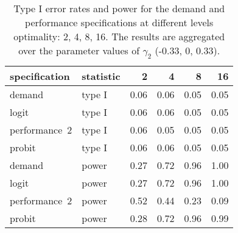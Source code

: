 \begin{table}[ht]
\centering
\begingroup\footnotesize
\begin{tabular}{llrrrr}
  \hline
specification & statistic & 2 & 4 & 8 & 16 \\ 
  \hline
demand & type I & 0.06 & 0.06 & 0.05 & 0.05 \\ 
  logit & type I & 0.06 & 0.06 & 0.05 & 0.05 \\ 
  performance~2 & type I & 0.06 & 0.05 & 0.05 & 0.05 \\ 
  probit & type I & 0.06 & 0.06 & 0.05 & 0.05 \\ 
  demand & power & 0.27 & 0.72 & 0.96 & 1.00 \\ 
  logit & power & 0.27 & 0.72 & 0.96 & 1.00 \\ 
  performance~2 & power & 0.52 & 0.44 & 0.23 & 0.09 \\ 
  probit & power & 0.28 & 0.72 & 0.96 & 0.99 \\ 
   \hline
\end{tabular}
\endgroup
\caption{Type I error rates and power for the demand and 
  performance specifications at different levels optimality: 2, 
  4, 8, 16. The results are aggregated over the parameter values 
  of $\gamma_2$ (-0.33, 0, 0.33).} 
\label{discrete-table}
\end{table}
